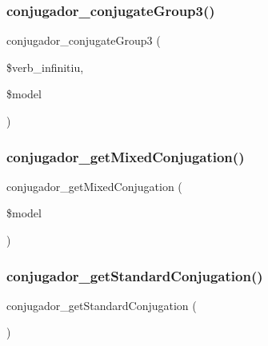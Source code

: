 \subsubsection{\texorpdfstring{conjugador\+\_\+conjugate\+Group3()}{conjugador\_conjugateGroup3()}}
{\footnotesize\ttfamily conjugador\+\_\+conjugate\+Group3 (\begin{DoxyParamCaption}\item[{}]{\$verb\+\_\+infinitiu,  }\item[{}]{\$model }\end{DoxyParamCaption})}

\hypertarget{conjugador__gr3_8inc_a63f5a06816fc5ba96efef90d519a22c4}{}\label{conjugador__gr3_8inc_a63f5a06816fc5ba96efef90d519a22c4} 
\subsubsection{\texorpdfstring{conjugador\+\_\+get\+Mixed\+Conjugation()}{conjugador\_getMixedConjugation()}}
{\footnotesize\ttfamily conjugador\+\_\+get\+Mixed\+Conjugation (\begin{DoxyParamCaption}\item[{}]{\$model }\end{DoxyParamCaption})}

\hypertarget{conjugador__gr3_8inc_ae0396ebccfe3276e0babfb92c143ddcd}{}\label{conjugador__gr3_8inc_ae0396ebccfe3276e0babfb92c143ddcd} 
\subsubsection{\texorpdfstring{conjugador\+\_\+get\+Standard\+Conjugation()}{conjugador\_getStandardConjugation()}}
{\footnotesize\ttfamily conjugador\+\_\+get\+Standard\+Conjugation (\begin{DoxyParamCaption}{ }\end{DoxyParamCaption})}

\hypertarget{conjugador__gr3_8inc_a3920febe59bd11cb42cd71eb1ecc1877}{}\label{conjugador__gr3_8inc_a3920febe59bd11cb42cd71eb1ecc1877} 

